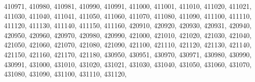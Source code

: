\textquotesingle{}410971\textquotesingle{}, \textquotesingle{}410980\textquotesingle{}, \textquotesingle{}410981\textquotesingle{}, \textquotesingle{}410990\textquotesingle{}, \textquotesingle{}410991\textquotesingle{}, \textquotesingle{}411000\textquotesingle{}, \textquotesingle{}411001\textquotesingle{}, \textquotesingle{}411010\textquotesingle{}, \textquotesingle{}411020\textquotesingle{}, \textquotesingle{}411021\textquotesingle{}, \textquotesingle{}411030\textquotesingle{}, \textquotesingle{}411040\textquotesingle{}, \textquotesingle{}411041\textquotesingle{}, \textquotesingle{}411050\textquotesingle{}, \textquotesingle{}411060\textquotesingle{}, \textquotesingle{}411070\textquotesingle{}, \textquotesingle{}411080\textquotesingle{}, \textquotesingle{}411090\textquotesingle{}, \textquotesingle{}411100\textquotesingle{}, \textquotesingle{}411110\textquotesingle{}, \textquotesingle{}411120\textquotesingle{}, \textquotesingle{}411130\textquotesingle{}, \textquotesingle{}411140\textquotesingle{}, \textquotesingle{}411150\textquotesingle{}, \textquotesingle{}411160\textquotesingle{}, \textquotesingle{}420910\textquotesingle{}, \textquotesingle{}420920\textquotesingle{}, \textquotesingle{}420930\textquotesingle{}, \textquotesingle{}420931\textquotesingle{}, \textquotesingle{}420940\textquotesingle{}, \textquotesingle{}420950\textquotesingle{}, \textquotesingle{}420960\textquotesingle{}, \textquotesingle{}420970\textquotesingle{}, \textquotesingle{}420980\textquotesingle{}, \textquotesingle{}420990\textquotesingle{}, \textquotesingle{}421000\textquotesingle{}, \textquotesingle{}421010\textquotesingle{}, \textquotesingle{}421020\textquotesingle{}, \textquotesingle{}421030\textquotesingle{}, \textquotesingle{}421040\textquotesingle{}, \textquotesingle{}421050\textquotesingle{}, \textquotesingle{}421060\textquotesingle{}, \textquotesingle{}421070\textquotesingle{}, \textquotesingle{}421080\textquotesingle{}, \textquotesingle{}421090\textquotesingle{}, \textquotesingle{}421100\textquotesingle{}, \textquotesingle{}421110\textquotesingle{}, \textquotesingle{}421120\textquotesingle{}, \textquotesingle{}421130\textquotesingle{}, \textquotesingle{}421140\textquotesingle{}, \textquotesingle{}421150\textquotesingle{}, \textquotesingle{}421160\textquotesingle{}, \textquotesingle{}421170\textquotesingle{}, \textquotesingle{}421180\textquotesingle{}, \textquotesingle{}430950\textquotesingle{}, \textquotesingle{}430951\textquotesingle{}, \textquotesingle{}430970\textquotesingle{}, \textquotesingle{}430971\textquotesingle{}, \textquotesingle{}430980\textquotesingle{}, \textquotesingle{}430990\textquotesingle{}, \textquotesingle{}430991\textquotesingle{}, \textquotesingle{}431000\textquotesingle{}, \textquotesingle{}431010\textquotesingle{}, \textquotesingle{}431020\textquotesingle{}, \textquotesingle{}431021\textquotesingle{}, \textquotesingle{}431030\textquotesingle{}, \textquotesingle{}431040\textquotesingle{}, \textquotesingle{}431050\textquotesingle{}, \textquotesingle{}431060\textquotesingle{}, \textquotesingle{}431070\textquotesingle{}, \textquotesingle{}431080\textquotesingle{}, \textquotesingle{}431090\textquotesingle{}, \textquotesingle{}431100\textquotesingle{}, \textquotesingle{}431110\textquotesingle{}, \textquotesingle{}431120\textquotesingle{}, 